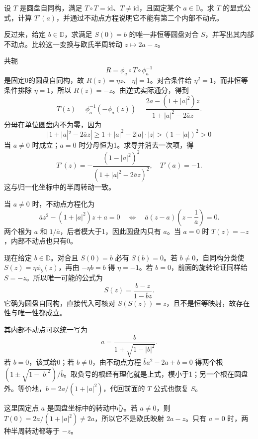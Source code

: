 \begin{exercise}\label{b3:ex:06-8}
设 \(T\) 是圆盘自同构，满足 \(T\circ T=\mathrm{id}\)、\(T\ne\mathrm{id}\)，且固定某个 \(a\in\mathbb D\)。求 \(T\) 的显式公式，计算 \(T'(a)\)，并通过不动点方程说明它不能有第二个内部不动点。

\ProseParagraphBreak

反过来，给定 \(b\in\mathbb D\)，求满足 \(S(0)=b\) 的唯一非恒等圆盘对合 \(S\)，并写出其内部不动点。比较这一变换与欧氏半周转动 \(z\mapsto2a-z\)。
\end{exercise}
\begin{solution}
共轭
\[
 R=\phi_a\circ T\circ\phi_a^{-1}
\]
是固定0的圆盘自同构，故 \(R(z)=\eta z\)、\(|\eta|=1\)。对合条件给 \(\eta^2=1\)，而非恒等条件排除 \(\eta=1\)，所以 \(R(z)=-z\)。由逆式实际通分，得到
\[
 T(z)=\phi_a^{-1}(-\phi_a(z))
 =\frac{2a-(1+|a|^2)z}{1+|a|^2-2\overline a z}.
\]
分母在单位圆盘内不为零，因为
\[
 |1+|a|^2-2\overline a z|
 \ge1+|a|^2-2|a|\cdot|z|
 > (1-|a|)^2>0
\]
当 \(a\ne0\) 时成立；\(a=0\) 时分母恒为1。求导并消去一次项，得
\[
 T'(z)
 =-\frac{(1-|a|^2)^2}
         {(1+|a|^2-2\overline a z)^2},
 \quad T'(a)=-1.
\]
这与归一化坐标中的半周转动一致。

当 \(a\ne0\) 时，不动点方程化为
\[
 \overline a z^2-(1+|a|^2)z+a=0
 \quad\Longleftrightarrow\quad
 \overline a(z-a)\left(z-\frac1{\overline a}\right)=0.
\]
两个根为 \(a\) 和 \(1/\overline a\)，后者模大于1，因此圆盘内只有 \(a\)。当 \(a=0\) 时 \(T(z)=-z\)，内部不动点也只有0。

现在给定 \(b\in\mathbb D\)。对合且 \(S(0)=b\) 必有 \(S(b)=0\)。若 \(b\ne0\)，自同构分类使
\(S(z)=\eta\phi_b(z)\)，再由 \(-\eta b=b\) 得 \(\eta=-1\)。若 \(b=0\)，前面的旋转论证同样给 \(S=-z\)。所以唯一可能的公式为
\[
 S(z)=\frac{b-z}{1-\overline b z}.
\]
它确为圆盘自同构，直接代入可核对 \(S(S(z))=z\)，且不是恒等映射，故存在性与唯一性都成立。

其内部不动点可以统一写为
\[
 a=\frac{b}{1+\sqrt{1-|b|^2}}.
\]
若 \(b=0\)，该式给0；若 \(b\ne0\)，由不动点方程
\(\overline b a^2-2a+b=0\) 得两个根
\((1\pm\sqrt{1-|b|^2})/\overline b\)。取负号的根经有理化就是上式，模小于1；另一个根在圆盘外。等价地，\(b=2a/(1+|a|^2)\)，代回前面的 \(T\) 公式也恢复 \(S\)。

这里固定点 \(a\) 是圆盘坐标中的转动中心。若 \(a\ne0\)，则
\(T(0)=2a/(1+|a|^2)\ne2a\)，所以它不是欧氏映射 \(2a-z\)。只有 \(a=0\) 时，两种半周转动都等于 \(-z\)。
\end{solution}
